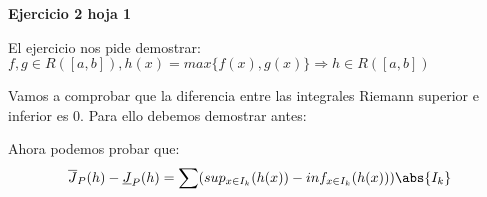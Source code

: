 \documentclass{apuntes}
\begin{document}
\begin{example}
\textbf{Ejercicio 2 hoja 1}

El ejercicio nos pide demostrar: $f,g \in R([a,b]), h(x) = max\lbrace f(x), g(x) \rbrace \Rightarrow h \in R([a,b])$

Vamos a comprobar que la diferencia entre las integrales Riemann superior e inferior es 0.
Para ello debemos demostrar antes:


Ahora podemos probar que:
\[\overline{J}_P(h)-\underline{J}_P(h)
= \sum(sup_{x\in I_k}(h(x))-inf_{x\in I_k}(h(x)))\abs{I_k}\]
\end{example}
\end{document}
